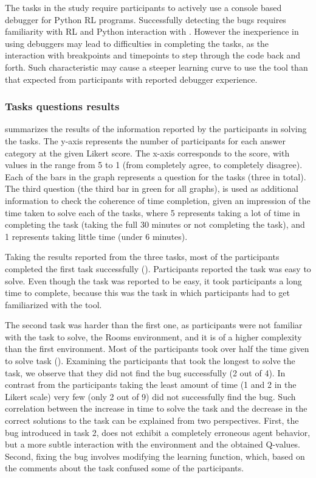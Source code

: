 The tasks in the study require participants to actively use a console based debugger for Python 
\ac{RL} programs. Successfully detecting the bugs requires familiarity with \ac{RL} and Python 
interaction with \flik. However the inexperience in using debuggers may lead to difficulties in 
completing the tasks, as the interaction with breakpoints and timepoints to step through the code 
back and forth. Such characteristic may cause a steeper learning curve to use the tool than that 
expected from participants with reported debugger experience.

\subsubsection{Tasks questions results}
\label{sec:tasks-results}

 summarizes the results of the information reported by the participants in 
solving the tasks. The y-axis represents the number of participants for each answer category at the  
given Likert score. The x-axis corresponds to the score, with values in the range from 5 to 1 (from 
completely agree, to completely disagree). Each of the bars in the graph represents a question for 
the tasks (three in total). The third question (the third bar in green for all graphs), is used as additional 
information to check the coherence of time completion, given an impression of the time taken to solve 
each of the tasks, where 5 represents taking a lot of time in completing the task (taking the full 30 minutes or not completing the task), and 1 represents taking little time (under 6 minutes).

Taking the results reported from the three tasks, most of the participants completed the first task 
successfully (). Participants reported the task was easy to solve. Even though the task 
was reported to be easy, it took participants a long time to complete, because this was the task in 
which participants had to get familiarized with the tool. 

The second task was harder than the first one, as participants were not familiar with the task to 
solve, the Rooms environment, and it is of a higher complexity than the first environment. Most of 
the participants took over half the time given to solve task (). Examining the 
participants that took the longest to solve the task, we observe that they did not find the bug 
successfully (2 out of 4). In contrast from the participants taking the least amount of time (1 and 2 in 
the Likert scale) very few (only 2 out of 9) did not successfully find the bug. Such correlation between 
the increase in time to solve the task and the decrease in the correct solutions to the task can be 
explained from two perspectives. First, the bug introduced in task 2, does not exhibit a completely 
erroneous agent behavior, but a more subtle interaction with the environment and the obtained 
Q-values. Second, fixing the bug involves modifying the learning function, which, based on the 
comments about the task confused some of the participants. 

